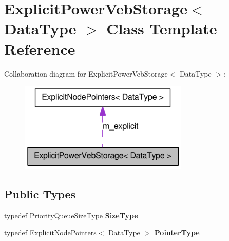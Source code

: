 \hypertarget{class_explicit_power_veb_storage}{
\section{ExplicitPowerVebStorage$<$ DataType $>$ Class Template Reference}
\label{class_explicit_power_veb_storage}
}


Collaboration diagram for ExplicitPowerVebStorage$<$ DataType $>$:\nopagebreak
\begin{figure}[H]
\begin{center}
\leavevmode
\includegraphics[width=228pt]{class_explicit_power_veb_storage__coll__graph}
\end{center}
\end{figure}
\subsection*{Public Types}
\begin{DoxyCompactItemize}
\item 
\hypertarget{class_explicit_power_veb_storage_abe13d6f48de8d199e07f75226194372f}{
typedef PriorityQueueSizeType {\bfseries SizeType}}
\label{class_explicit_power_veb_storage_abe13d6f48de8d199e07f75226194372f}

\item 
\hypertarget{class_explicit_power_veb_storage_a726c7dccebdf2d7dddfca150d2bcfa0d}{
typedef \hyperlink{class_explicit_node_pointers}{ExplicitNodePointers}$<$ DataType $>$ {\bfseries PointerType}}
\label{class_explicit_power_veb_storage_a726c7dccebdf2d7dddfca150d2bcfa0d}

\end{DoxyCompactItemize}

